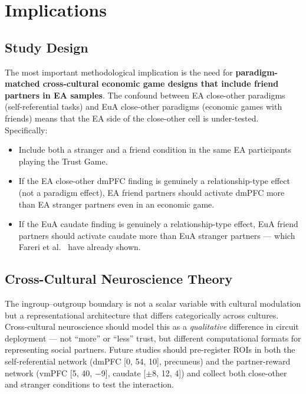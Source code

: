 \documentclass[11pt,a4paper]{article}
\begin{document}
\section{Implications}

\subsection{Study Design}

The most important methodological implication is the need for \textbf{paradigm-matched
cross-cultural economic game designs that include friend partners in EA samples}. The
confound between EA close-other paradigms (self-referential tasks) and EuA close-other
paradigms (economic games with friends) means that the EA side of the close-other cell
is under-tested. Specifically:
\begin{itemize}
  \item Include both a stranger and a friend condition in the same EA participants playing
    the Trust Game.
  \item If the EA close-other dmPFC finding is genuinely a relationship-type effect (not
    a paradigm effect), EA friend partners should activate dmPFC more than EA stranger
    partners even in an economic game.
  \item If the EuA caudate finding is genuinely a relationship-type effect, EuA friend
    partners should activate caudate more than EuA stranger partners — which Fareri et al.\
    \citeyear{Fareri2012} have already shown.
\end{itemize}

\subsection{Cross-Cultural Neuroscience Theory}

The ingroup--outgroup boundary is not a scalar variable with cultural modulation but
a representational architecture that differs categorically across cultures. Cross-cultural
neuroscience should model this as a \emph{qualitative} difference in circuit deployment —
not ``more'' or ``less'' trust, but different computational formats for representing social
partners. Future studies should pre-register ROIs in both the self-referential network
(dmPFC [0, 54, 10], precuneus) and the partner-reward network (vmPFC [5, 40, $-$9],
caudate [$\pm$8, 12, 4]) and collect both close-other and stranger conditions to test
the interaction.
\end{document}
